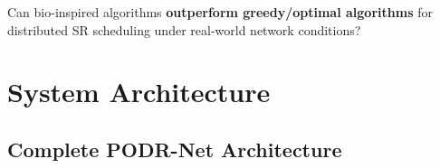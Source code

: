\documentclass[11pt, a4paper]{article}
\begin{document}
\begin{researchq}
Can bio-inspired algorithms \textbf{outperform greedy/optimal algorithms} for distributed SR scheduling under real-world network conditions?
\end{researchq}

\section{System Architecture}

\subsection{Complete PODR-Net Architecture}
\end{document}
